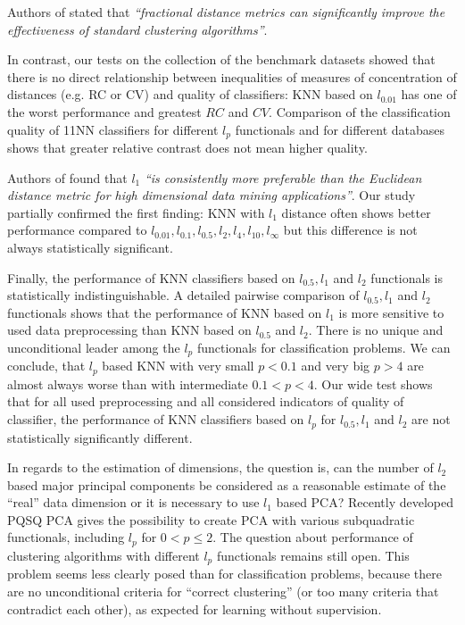 \documentclass[entropy,article,submit,moreauthors,pdftex]{Definitions/mdpi}
\begin{document}
Authors of \cite{aggarwal2001} stated that \textit{ ``fractional distance metrics can significantly improve the effectiveness of standard clustering algorithms''}.

In contrast, our tests on the collection of the benchmark datasets showed that there is no direct relationship between inequalities of measures of concentration of distances (e.g. RC or CV) and quality of classifiers: KNN based on $l_{0.01}$ has one of the worst performance and greatest $RC$ and $CV$. Comparison of the classification quality of 11NN classifiers for different $l_p$ functionals and for different databases shows that greater relative contrast does not mean higher quality.

Authors of \cite{aggarwal2001} found that $l_1$ \textit{``is consistently more preferable than the Euclidean distance metric for high dimensional data mining applications''}.
Our study partially confirmed the first finding: KNN with $l_1$ distance often shows better performance compared to $l_{0.01}, l_{0.1}, l_{0.5}, l_{2}, l_{4}, l_{10}, l_{\infty}$ but this difference is not always statistically significant.

Finally, the performance of KNN classifiers based on $l_{0.5}, l_1$ and $l_2$ functionals is statistically indistinguishable. A detailed pairwise comparison of $l_{0.5}, l_1$ and $l_2$ functionals shows that the performance of KNN based on $l_1$ is more sensitive to used data preprocessing than KNN based on $l_0.5$ and $l_2$. There is no unique and unconditional leader among the $l_p$ functionals for classification problems. We can conclude, that $l_p$ based KNN with very small $p<0.1$ and very big $p>4$ are almost always worse than with intermediate $0.1<p<4$. Our wide test shows that for all used preprocessing and all considered indicators of quality of classifier, the  performance of KNN classifiers based on $l_p$ for $l_{0.5}, l_1$ and $l_2$ are not statistically significantly different.

In regards to the estimation of dimensions, the question is, can the number of $l_2$ based  major principal components be considered as a reasonable estimate of  the ``real'' data dimension or it is necessary to use $l_1$ based PCA? Recently developed PQSQ PCA \cite{gorban2018PQSQ} gives the possibility  to create PCA with various subquadratic functionals, including $l_p$ for $0<p\le 2$. The question about performance of clustering algorithms with different $l_p$ functionals remains still open.  This problem seems less clearly posed than for classification problems, because there are no unconditional criteria for ``correct clustering'' (or too many criteria that contradict each other), as expected for learning without supervision.
\end{document}
